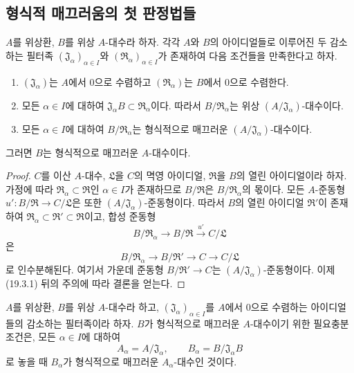 \subsection{형식적 매끄러움의 첫 판정법들}
\label{subsection:0.19.4-fr}

\begin{proposition}[19.4.1]
\label{0.19.4.1-fr}
$A$를 위상환, $B$를 위상 $A$-대수라 하자. 각각 $A$와 $B$의
아이디얼들로 이루어진 두 감소하는 필터족
$(\mathfrak J_\alpha)_{\alpha\in I}$와
$(\mathfrak R_\alpha)_{\alpha\in I}$가 존재하여 다음 조건들을
만족한다고 하자.
\begin{enumerate}
  \item[$1^\circ$] $(\mathfrak J_\alpha)$는 $A$에서 $0$으로 수렴하고
  $(\mathfrak R_\alpha)$는 $B$에서 $0$으로 수렴한다.
  \item[$2^\circ$] 모든 $\alpha\in I$에 대하여
  $\mathfrak J_\alpha B\subset\mathfrak R_\alpha$이다. 따라서
  $B/\mathfrak R_\alpha$는 위상
  $(A/\mathfrak J_\alpha)$-대수이다.
  \item[$3^\circ$] 모든 $\alpha\in I$에 대하여
  $B/\mathfrak R_\alpha$는 형식적으로 매끄러운
  $(A/\mathfrak J_\alpha)$-대수이다.
\end{enumerate}
그러면 $B$는 형식적으로 매끄러운 $A$-대수이다.
\end{proposition}

\begin{proof}
$C$를 이산 $A$-대수, $\mathfrak L$을 $C$의 멱영 아이디얼,
$\mathfrak R$을 $B$의 열린 아이디얼이라 하자. 가정에 따라
$\mathfrak R_\alpha\subset\mathfrak R$인 $\alpha\in I$가 존재하므로
$B/\mathfrak R$은 $B/\mathfrak R_\alpha$의 몫이다. 모든
$A$-준동형 $u':B/\mathfrak R\to C/\mathfrak L$은 또한
$(A/\mathfrak J_\alpha)$-준동형이다. 따라서 $B$의 열린 아이디얼
$\mathfrak R'$이 존재하여
$\mathfrak R_\alpha\subset\mathfrak R'\subset\mathfrak R$이고, 합성
준동형
\[
  B/\mathfrak R_\alpha\longrightarrow B/\mathfrak R
  \xrightarrow{u'}C/\mathfrak L
\]
은
\[
  B/\mathfrak R_\alpha\longrightarrow B/\mathfrak R'
  \longrightarrow C\longrightarrow C/\mathfrak L
\]
로 인수분해된다. 여기서 가운데 준동형
$B/\mathfrak R'\to C$는
$(A/\mathfrak J_\alpha)$-준동형이다. 이제 (19.3.1) 뒤의 주의에
따라 결론을 얻는다.
\end{proof}

\begin{corollary}[19.4.2]
\label{0.19.4.2-fr}
$A$를 위상환, $B$를 위상 $A$-대수라 하고,
$(\mathfrak J_\alpha)_{\alpha\in I}$를 $A$에서 $0$으로 수렴하는
아이디얼들의 감소하는 필터족이라 하자. $B$가 형식적으로 매끄러운
$A$-대수이기 위한 필요충분조건은, 모든 $\alpha\in I$에 대하여
\[
  A_\alpha=A/\mathfrak J_\alpha,\qquad
  B_\alpha=B/\mathfrak J_\alpha B
\]
로 놓을 때 $B_\alpha$가 형식적으로 매끄러운
$A_\alpha$-대수인 것이다.
\end{corollary}

